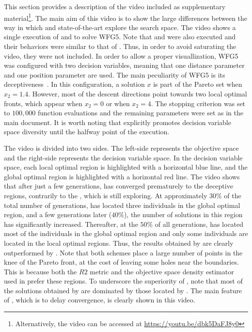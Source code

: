 This section provides a description of the video included as supplementary material\footnote{Alternatively, the video can be accessed 
at \url{https://youtu.be/dbk5DaFJ8y0}}.
%
The main aim of this video is to show the large differences between the way in which \VSDMOEA{} and state-of-the-art \MOEAS{} 
explore the search space.
%
The video shows a single execution of \VSDMOEA{} and \RMOEA{} to solve WFG5.
%
Note that \NSGAII{} and \MOEAD{} were also executed and their behaviors were similar to that of \RMOEA{}.
%
Thus, in order to avoid saturating the video, they were not included.
%
In order to allow a proper visuallization, WFG5 was configured with two decision variables, meaning that one distance parameter
and one position parameter are used.
%
The main peculiarity of WFG5 is its deceptiveness~\cite{Joel:WFG}.
%
In this configuration, a solution $x$ is part of the Pareto set when $x_2 = 1.4$.
%
However, most of the descent directions point towards two local optimal fronts, which appear when $x_2 = 0$ or when $x_2 = 4$.
%
The stopping criterion was set to $100,000$ function evaluations and the remaining parameters were set as in the main document.
%
It is worth noting that \VSDMOEA{} explicitly promotes decision variable space diversity until the halfway point of the execution.

The video is divided into two sides.
%
The left-side represents the objective space and the right-side represents the decision variable space.
%
In the decision variable space, each local optimal region is highlighted with a horizontal blue line, and the global optimal region is highlighted 
with a horizontal red line.
%
The video shows that after just a few generations, \RMOEA{} has converged prematurely to the deceptive regions, 
contrarily to the \VSDMOEA{}, which is still exploring.
%
At approximately $30\%$ of the total number of generations, \VSDMOEA{} has 
located three individuals in the global optimal region, and a few generations later ($40\%$),
the number of solutions in this region has significantly increased.
%
Thereafter, at the $50\%$ of all generations, \VSDMOEA{} has located most of the individuals in the global optimal region and only 
some individuals are located in the local optimal regions.
%
Thus, the results obtained by \RMOEA{} are clearly outperformed by \VSDMOEA{}.
%
Note that both schemes place a large number of points in the knee of the Pareto front, at the cost of leaving some holes near the boundaries.
%
This is because both the $R2$ metric and the objective space density estimator used in \VSDMOEA{} prefer these regions.
%
To underscore the superiority of \VSDMOEA{}, note that most of the solutions obtained by \RMOEA{} are dominated by those 
located by \VSDMOEA{}.
%
The main feature of \VSDMOEA{}, which is to delay convergence, is clearly shown in this video.

